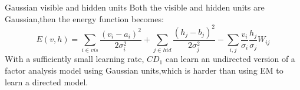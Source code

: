 \documentclass{beamer}
\begin{document}
\begin{CJK*}{UTF8}{gbsn}
\begin{frame}[allowframebreaks]
\begin{block}{Gaussian visible and hidden units}
Both the visible and hidden units are Gaussian,then the energy function becomes:
\begin{equation}
E(v,h)=\sum_{i\in vis}\frac{(v_i-a_i)^2}{2\sigma_i^2}+\sum_{j\in hid}\frac{(h_j-b_j)^2}{2\sigma_j^2}-\sum_{i,j}\frac{v_i}{\sigma_i}\frac{h_j}{\sigma_j}W_{ij}
\end{equation}
With a sufficiently small learning rate, $CD_1$ can learn an undirected version of a factor analysis model using Gaussian units,which is harder than using EM to learn a directed model.
\end{block}

\end{frame}

\end{CJK*}
\end{document}
